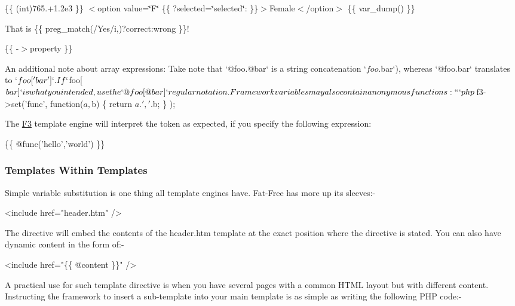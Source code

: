 \{\{ (int)765.+1.2e3 \}\} $<$option value=\char`\"{}\+F\char`\"{} \{\{ ?\textquotesingle{}selected=\char`\"{}selected\char`\"{}\textquotesingle{}\+:\textquotesingle{}\textquotesingle{} \}\}$>$Female$<$/option$>$ \{\{ var\+\_\+dump() \}\} 

That is \{\{ preg\+\_\+match(\textquotesingle{}/\+Yes/i\textquotesingle{},)?\textquotesingle{}correct\textquotesingle{}\+:\textquotesingle{}wrong\textquotesingle{} \}\}!

\{\{ -\/$>$property \}\} 
\begin{DoxyCode}
An additional note about array expressions: Take note that `@foo.@bar` is a string concatenation
       `$foo.$bar`), whereas `@foo.bar` translates to `$foo['bar']`. If `$foo[$bar]` is what you intended, use the
       `@foo[@bar]` regular notation.

Framework variables may also contain anonymous functions:

``` php
$f3->set('func',
    function($a,$b) \{
        return $a.', '.$b;
    \}
);
\end{DoxyCode}


The \hyperlink{class_f3}{F3} template engine will interpret the token as expected, if you specify the following expression\+:


\begin{DoxyCode}
\{\{ @func('hello','world') \}\}
\end{DoxyCode}


\subsubsection*{Templates Within Templates}

Simple variable substitution is one thing all template engines have. Fat-\/\+Free has more up its sleeves\+:-\/


\begin{DoxyCode}
<include href="header.htm" />
\end{DoxyCode}


The  directive will embed the contents of the header.\+htm template at the exact position where the directive is stated. You can also have dynamic content in the form of\+:-\/


\begin{DoxyCode}
<include href="\{\{ @content \}\}" />
\end{DoxyCode}


A practical use for such template directive is when you have several pages with a common H\+T\+ML layout but with different content. Instructing the framework to insert a sub-\/template into your main template is as simple as writing the following P\+HP code\+:-\/


